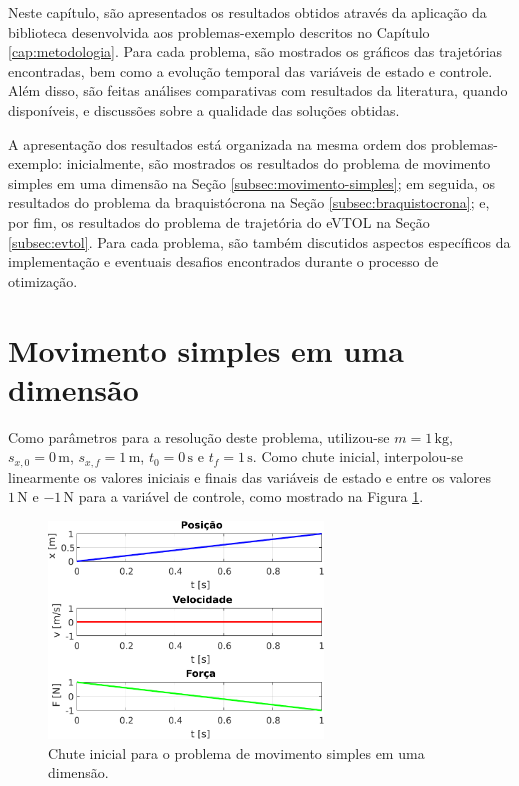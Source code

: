 Neste capítulo, são apresentados os resultados obtidos através da aplicação da biblioteca desenvolvida aos problemas-exemplo descritos no Capítulo \ref{cap:metodologia}. Para cada problema, são mostrados os gráficos das trajetórias encontradas, bem como a evolução temporal das variáveis de estado e controle. Além disso, são feitas análises comparativas com resultados da literatura, quando disponíveis, e discussões sobre a qualidade das soluções obtidas.

A apresentação dos resultados está organizada na mesma ordem dos problemas-exemplo: inicialmente, são mostrados os resultados do problema de movimento simples em uma dimensão na Seção \ref{subsec:movimento-simples}; em seguida, os resultados do problema da braquistócrona na Seção \ref{subsec:braquistocrona}; e, por fim, os resultados do problema de trajetória do eVTOL na Seção \ref{subsec:evtol}. Para cada problema, são também discutidos aspectos específicos da implementação e eventuais desafios encontrados durante o processo de otimização.

\section{Movimento simples em uma dimensão}
\label{sec:resultados-movimento-simples}

Como parâmetros para a resolução deste problema, utilizou-se $m=1 \, \si{\kilo\gram}$, $s_{x,0}=0 \, \si{\meter}$, $s_{x,f}=1 \, \si{\meter}$, $t_0=0 \, \si{\second}$ e $t_f=1 \, \si{\second}$. Como chute inicial, interpolou-se linearmente os valores iniciais e finais das variáveis de estado e entre os valores $1 \, \si{\newton}$ e $-1 \, \si{\newton}$ para a variável de controle, como mostrado na Figura \ref{fig:resultados-movimento-simples-chute}.

\begin{figure}
    \centering
    \includegraphics[width=0.65\textwidth]{Cap4/figuras/movimento-simples-chute.pdf}
    \caption{Chute inicial para o problema de movimento simples em uma dimensão.}
    \label{fig:resultados-movimento-simples-chute}
\end{figure}

